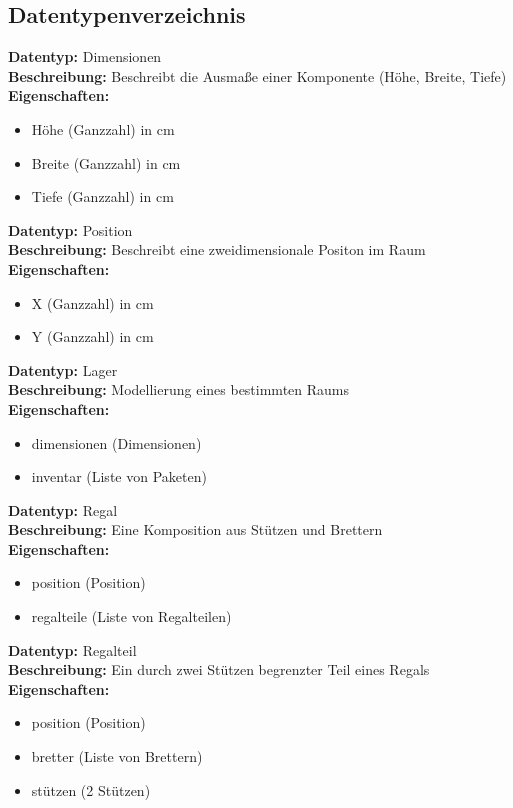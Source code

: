 \subsection{Datentypenverzeichnis}
\textbf{Datentyp:} Dimensionen\\
\textbf{Beschreibung:} Beschreibt die Ausmaße einer Komponente (Höhe, Breite, Tiefe)\\
\textbf{Eigenschaften:}
\begin{itemize}
    \setlength\itemsep{0em}
    \item Höhe (Ganzzahl) in cm
    \item Breite (Ganzzahl) in cm
    \item Tiefe (Ganzzahl) in cm
\end{itemize}
\bigskip
\textbf{Datentyp:} Position\\
\textbf{Beschreibung:} Beschreibt eine zweidimensionale Positon im Raum\\
\textbf{Eigenschaften:}
\begin{itemize}
    \setlength\itemsep{0em}
    \item X (Ganzzahl) in cm
    \item Y (Ganzzahl) in cm
\end{itemize}
\textbf{Datentyp:} Lager\\
\textbf{Beschreibung:} Modellierung eines bestimmten Raums\\
\textbf{Eigenschaften:}
\begin{itemize}
    \setlength\itemsep{0em}
    \item dimensionen (Dimensionen)
    \item inventar (Liste von Paketen)
\end{itemize}
\bigskip
\textbf{Datentyp:} Regal\\
\textbf{Beschreibung:} Eine Komposition aus Stützen und Brettern\\
\textbf{Eigenschaften:}
\begin{itemize}
    \setlength\itemsep{0em}
    \item position (Position)
    \item regalteile (Liste von Regalteilen)
\end{itemize}
\bigskip
\textbf{Datentyp:} Regalteil\\
\textbf{Beschreibung:} Ein durch zwei Stützen begrenzter Teil eines Regals\\
\textbf{Eigenschaften:}
\begin{itemize}
    \setlength\itemsep{0em}
    \item position (Position)
    \item bretter (Liste von Brettern)
    \item stützen (2 Stützen)
\end{itemize}
